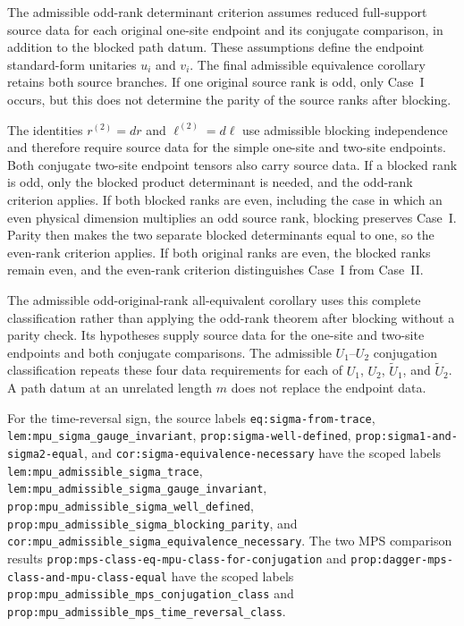 \documentclass{article}
\begin{document}
The admissible odd-rank determinant criterion assumes reduced full-support
source data for each original one-site endpoint and its conjugate comparison,
in addition to the blocked path datum. These assumptions define the endpoint
standard-form unitaries $u_i$ and $v_i$. The final admissible equivalence
corollary retains both source branches. If one original source rank is odd,
only Case~I occurs, but this does not determine the parity of the source ranks
after blocking.

The identities $r^{(2)}=dr$ and $\ell^{(2)}=d\ell$ use admissible blocking
independence and therefore require source data for the simple one-site and
two-site endpoints. Both conjugate two-site endpoint tensors also carry source
data. If a blocked rank is odd, only the blocked product determinant is needed,
and the odd-rank criterion applies. If both blocked ranks are even, including
the case in which an even physical dimension multiplies an odd source rank,
blocking preserves Case~I. Parity then makes the two separate blocked
determinants equal to one, so the even-rank criterion applies. If both original
ranks are even, the blocked ranks remain even, and the even-rank criterion
distinguishes Case~I from Case~II.

The admissible odd-original-rank all-equivalent corollary uses this complete
classification rather than applying the odd-rank theorem after blocking
without a parity check. Its hypotheses supply source data for the one-site and
two-site endpoints and both conjugate comparisons. The admissible
$U_1$--$U_2$ conjugation classification repeats these four data requirements
for each of $U_1$, $U_2$, $\widetilde U_1$, and $\widetilde U_2$. A path datum
at an unrelated length $m$ does not replace the endpoint data.

For the time-reversal sign, the source labels
\texttt{eq:sigma-from-trace},
\texttt{lem:mpu\_sigma\_gauge\_invariant},
\texttt{prop:sigma-well-defined},
\texttt{prop:sigma1-and-sigma2-equal}, and
\texttt{cor:sigma-equivalence-necessary} have the scoped labels
\texttt{lem:mpu\_admissible\_sigma\_trace},
\texttt{lem:mpu\_admissible\_sigma\_gauge\_invariant},
\texttt{prop:mpu\_admissible\_sigma\_well\_defined},
\texttt{prop:mpu\_admissible\_sigma\_blocking\_parity}, and
\texttt{cor:mpu\_admissible\_sigma\_equivalence\_necessary}. The two MPS
comparison results
\texttt{prop:mps-class-eq-mpu-class-for-conjugation} and
\texttt{prop:dagger-mps-class-and-mpu-class-equal} have the scoped labels
\texttt{prop:mpu\_admissible\_mps\_conjugation\_class} and
\texttt{prop:mpu\_admissible\_mps\_time\_reversal\_class}.
\end{document}
